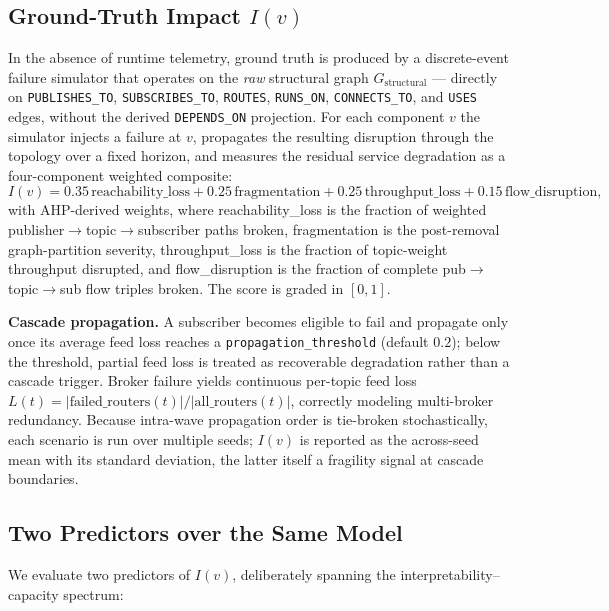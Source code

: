 \documentclass[review]{elsarticle}
\begin{document}
\subsection{Ground-Truth Impact $I(v)$}

In the absence of runtime telemetry, ground truth is produced by a discrete-event failure simulator
that operates on the \emph{raw} structural graph $G_{\text{structural}}$ --- directly on
\texttt{PUBLISHES\_TO}, \texttt{SUBSCRIBES\_TO}, \texttt{ROUTES}, \texttt{RUNS\_ON},
\texttt{CONNECTS\_TO}, and \texttt{USES} edges, without the derived \texttt{DEPENDS\_ON} projection.
For each component $v$ the simulator injects a failure at $v$, propagates the resulting disruption
through the topology over a fixed horizon, and measures the residual service degradation as a
four-component weighted composite:
\begin{equation}
I(v) = 0.35\,\text{reachability\_loss} + 0.25\,\text{fragmentation}
+ 0.25\,\text{throughput\_loss} + 0.15\,\text{flow\_disruption},
\end{equation}
with AHP-derived weights, where reachability\_loss is the fraction of weighted
publisher$\to$topic$\to$subscriber paths broken, fragmentation is the post-removal graph-partition
severity, throughput\_loss is the fraction of topic-weight throughput disrupted, and
flow\_disruption is the fraction of complete pub$\to$topic$\to$sub flow triples broken. The score is
graded in $[0,1]$.

\textbf{Cascade propagation.} A subscriber becomes eligible to fail and propagate only once its
average feed loss reaches a \texttt{propagation\_threshold} (default $0.2$); below the threshold,
partial feed loss is treated as recoverable degradation rather than a cascade trigger. Broker
failure yields continuous per-topic feed loss $L(t) = |\text{failed\_routers}(t)| /
|\text{all\_routers}(t)|$, correctly modeling multi-broker redundancy. Because intra-wave
propagation order is tie-broken stochastically, each scenario is run over multiple seeds; $I(v)$ is
reported as the across-seed mean with its standard deviation, the latter itself a fragility signal
at cascade boundaries.

\subsection{Two Predictors over the Same Model}

We evaluate two predictors of $I(v)$, deliberately spanning the interpretability--capacity spectrum:
\end{document}
